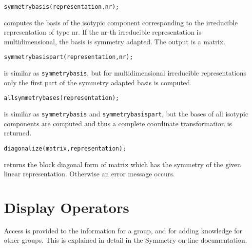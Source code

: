 {\tt symmetrybasis(representation,nr);}

computes the basis of the isotypic component corresponding to the irreducible
representation of type nr. If the nr-th irreducible representation is
multidimensional, the basis is symmetry adapted. The output is a matrix.
 
{\tt symmetrybasispart(representation,nr);}

is similar as {\tt symmetrybasis}, but for multidimensional 
irreducible representations only the first part of the 
symmetry adapted basis is computed.

{\tt allsymmetrybases(representation);}

is similar as {\tt symmetrybasis} and {\tt symmetrybasispart}, 
but the bases of all
isotypic components are computed and thus a 
complete coordinate transformation is returned.

{\tt diagonalize(matrix,representation);}

returns the block diagonal form of matrix which has the symmetry 
of the given linear representation. Otherwise an error message occurs.


\section{Display Operators}

Access is provided to the information for a group, and for adding
knowledge for other groups.  This is explained in detail in the
Symmetry on-line documentation.

